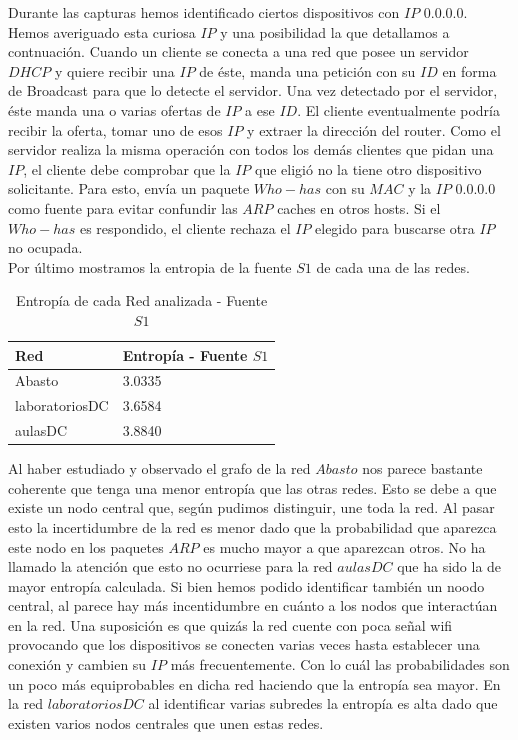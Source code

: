 Durante las capturas hemos identificado ciertos dispositivos con $IP$ 0.0.0.0. 
Hemos averiguado esta curiosa $IP$ y una posibilidad la que detallamos a contnuación. Cuando un cliente se conecta a una red que posee un servidor 
$DHCP$ y quiere recibir una $IP$ de éste, manda una petición con su $ID$ en forma de Broadcast para que lo detecte el servidor. 
Una vez detectado por el servidor, éste manda una o varias ofertas de $IP$ a ese $ID$. El cliente eventualmente podría recibir la oferta, 
tomar uno de esos $IP$ y extraer la dirección del router. Como el servidor realiza la misma operación con todos los demás clientes 
que pidan una $IP$, el cliente debe comprobar que la $IP$ que eligió no la tiene otro dispositivo solicitante. Para esto, envía un paquete 
$Who-has$ con su $MAC$ y la $IP$ 0.0.0.0 como fuente para evitar confundir las $ARP$ caches en otros hosts. 
Si el $Who-has$ es respondido, el cliente rechaza el $IP$ elegido para buscarse otra $IP$ no ocupada.\\

Por último mostramos la entropia de la fuente $S1$ de cada una de las redes.\\

\begin{table}[htb]
\begin{center}
\begin{tabular}{|l|l|}
\hline
Red & Entropía - Fuente $S1$  \\
\hline \hline
Abasto & 3.0335 \\ \hline
laboratoriosDC & 3.6584 \\ \hline
aulasDC & 3.8840  \\ \hline
\end{tabular}
\caption{Entropía de cada Red analizada - Fuente $S1$}
\label{tabla informacion}
\end{center}
\end{table}

Al haber estudiado y observado el grafo de la red $Abasto$ nos parece bastante coherente que tenga una menor entropía que las otras redes. Esto se 
debe a que existe un nodo central que, según pudimos distinguir, une toda la red. Al pasar esto la incertidumbre de la red es menor dado que 
la probabilidad que aparezca este nodo en los paquetes $ARP$ es mucho mayor a que aparezcan otros. No ha llamado la atención que esto no ocurriese 
para la red $aulasDC$ que ha sido la de mayor entropía calculada. Si bien hemos podido identificar también un noodo central, al parece hay más 
incentidumbre en cuánto a los nodos que interactúan en la red. Una suposición es que quizás la red cuente con poca señal wifi provocando que 
los dispositivos se conecten varias veces hasta establecer una conexión y cambien su $IP$ más frecuentemente. Con lo cuál las probabilidades son un 
poco más equiprobables en dicha red haciendo que la entropía sea mayor.
En la red $laboratoriosDC$ al identificar varias subredes la entropía es alta dado que existen varios nodos centrales que unen estas redes.

